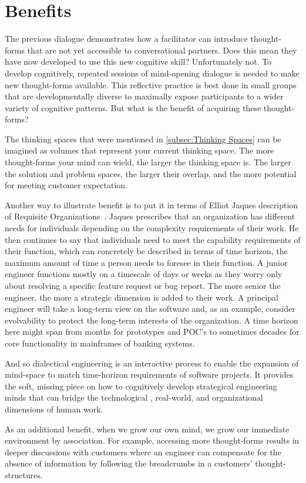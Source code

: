 \section{Benefits}

The previous dialogue demonstrates how a facilitator can introduce thought-forms that are not yet accessible to
conversational partners.
Does this mean they have now developed to use this new cognitive skill?
Unfortunately not.
To develop cognitively, repeated sessions of mind-opening dialogue is needed to make new thought-forms available.
This reflective practice is best done in small groups that are developmentally diverse to maximally expose
participants to a wider variety of cognitive patterns.
But what is the benefit of acquiring these thought-forms?

The thinking spaces that were mentioned in \ref{subsec:Thinking Spaces} can be imagined as volumes that represent your
current thinking
space.
The more thought-forms your mind can wield, the larger the thinking space is.
The larger the solution and problem spaces, the larger their overlap, and the more potential for meeting customer
expectation.

Another way to illustrate benefit is to put it in terms of Elliot Jaques description of Requisite Organizations~\citep{jaques1989requisite}.
Jaques prescribes that an organization has different needs for individuals depending on the complexity requirements
of their work.
He then continues to say that individuals need to meet the capability requirements of their function, which can
concretely be described in terms of time horizon, the maximum amount of time a person needs to foresee in their
function.
A junior engineer functions mostly on a timescale of days or weeks as they worry only about resolving a specific
feature request or bug report.
The more senior the engineer, the more a strategic dimension is added to their work.
A principal engineer will take a long-term view on the software and, as an example, consider evolvability to protect
the long-term interests of the organization.
A time horizon here might span from months for prototypes and POC's to sometimes decades for core functionality in
mainframes of banking systems.

And so dialectical engineering is an interactive process to enable the expansion of mind-space to match time-horizon
requirements of software projects.
It provides the soft, missing piece on how to cognitively develop strategical engineering minds that can bridge the
technological
, real-world, and organizational dimensions of human work.

As an additional benefit, when we grow our own mind, we grow our immediate environment by association.
For example, accessing more thought-forms results in deeper discussions with customers where an engineer can
compensate for the absence of information by following the breadcrumbs in a customers' thought-structures.